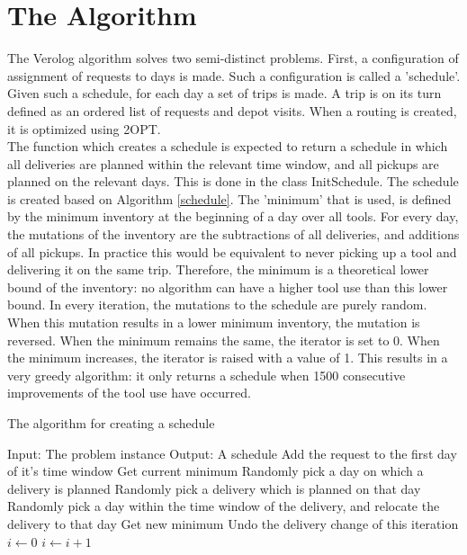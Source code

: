 \documentclass[a4paper]{article}
\begin{document}
\section{The Algorithm}
The Verolog algorithm solves two semi-distinct problems. First, a configuration of assignment of requests to days is made. Such a configuration is called a 'schedule'. Given such a schedule, for each day a set of trips is made. A trip is on its turn defined as an ordered list of requests and depot visits. When a routing is created, it is optimized using 2OPT.\\

The function which creates a schedule is expected to return a schedule in which all deliveries are planned within the relevant time window, and all pickups are planned on the relevant days. This is done in the class InitSchedule. The schedule is created based on Algorithm \ref{schedule}. The 'minimum' that is used, is defined by the minimum inventory at the beginning of a day over all tools. For every day, the mutations of the inventory are the subtractions of all deliveries, and additions of all pickups. In practice this would be equivalent to never picking up a tool and delivering it on the same trip. Therefore, the minimum is a theoretical lower bound of the inventory: no algorithm can have a higher tool use than this lower bound. In every iteration, the mutations to the schedule are purely random. When this mutation results in a lower minimum inventory, the mutation is reversed. When the minimum remains the same, the iterator is set to 0. When the minimum increases, the iterator is raised with a value of 1. This results in a very greedy algorithm: it only returns a schedule when 1500 consecutive improvements of the tool use have occurred.

\begin{algorithm}[H]
	\caption{The algorithm for creating a schedule}
	\label{schedule}
	\begin{algorithmic}
		\State Input: The problem instance
		\State Output: A schedule
			\State Add the request to the first day of it's time window 
		\EndFor
		\State Get current minimum
			\State Randomly pick a day on which a delivery is planned
			\State Randomly pick a delivery which is planned on that day
			\State Randomly pick a day within the time window of the delivery, and relocate the delivery to that day
			\State Get new minimum
				\State Undo the delivery change of this iteration
			\Else
					\State $i \gets 0$
				\Else
					\State $i \gets i+1$
				\EndIf
			\EndIf
		\EndWhile
	\end{algorithmic}
\end{algorithm}
\end{document}
